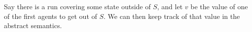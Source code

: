 	Say there is a run covering some state outside of $S$, and let $v$ be the value of one of the first agents to get out of $S$. We can then keep track of that value in the abstract semantics. 
	
%


